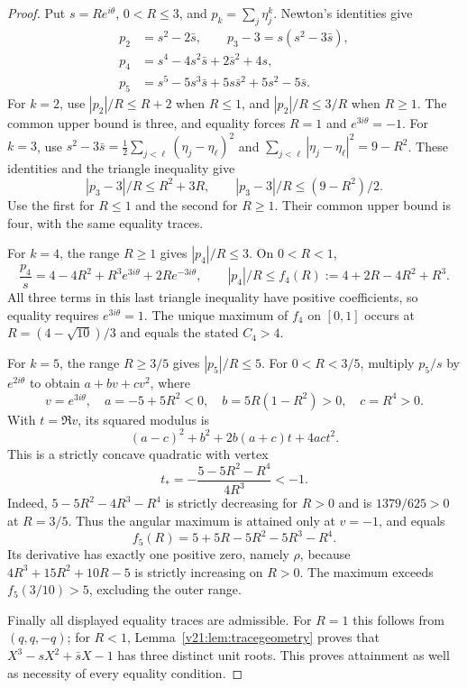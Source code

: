 \documentclass[UTF8,11pt]{ctexart}
\theoremstyle{definition}
\numberwithin{equation}{section}
\begin{document}
\begin{proof}
Put $s=R e^{i\theta}$, $0<R\le3$, and
$p_k=\sum_j\eta_j^k$. Newton's identities give
\[
 \begin{split}
 p_2&=s^2-2\bar s,\qquad p_3-3=s(s^2-3\bar s),\\
 p_4&=s^4-4s^2\bar s+2\bar s^2+4s,\\
 p_5&=s^5-5s^3\bar s+5s\bar s^2+5s^2-5\bar s.
 \end{split}
\]
For $k=2$, use $|p_2|/R\le R+2$ when $R\le1$, and
$|p_2|/R\le3/R$ when $R\ge1$. The common upper bound is three,
and equality forces $R=1$ and $e^{3i\theta}=-1$.
For $k=3$, use
$s^2-3\bar s=\tfrac12\sum_{j<\ell}(\eta_j-\eta_\ell)^2$
and $\sum_{j<\ell}|\eta_j-\eta_\ell|^2=9-R^2$.
These identities and the triangle inequality give
\[
 |p_3-3|/R\le R^2+3R,\qquad
 |p_3-3|/R\le(9-R^2)/2.
\]
Use the first for $R\le1$ and the second for $R\ge1$. Their
common upper bound is four, with the same equality traces.

For $k=4$, the range $R\ge1$ gives $|p_4|/R\le3$. On $0<R<1$,
\[
 \frac{p_4}{s}=4-4R^2+R^3e^{3i\theta}+2Re^{-3i\theta},
 \qquad |p_4|/R\le f_4(R):=4+2R-4R^2+R^3.
\]
All three terms in this last triangle inequality have positive
coefficients, so equality requires $e^{3i\theta}=1$.
The unique maximum of $f_4$ on $[0,1]$ occurs at
$R=(4-\sqrt{10})/3$ and equals the stated $C_4>4$.

For $k=5$, the range $R\ge3/5$ gives $|p_5|/R\le5$. For
$0<R<3/5$, multiply $p_5/s$ by $e^{2i\theta}$ to obtain
$a+bv+cv^2$, where
\[
 v=e^{3i\theta},\quad a=-5+5R^2<0,\quad
 b=5R(1-R^2)>0,\quad c=R^4>0.
\]
With $t=\Re v$, its squared modulus is
\[
 (a-c)^2+b^2+2b(a+c)t+4ac t^2.
\]
This is a strictly concave quadratic with vertex
\[
 t_*=-\frac{5-5R^2-R^4}{4R^3}<-1.
\]
Indeed, $5-5R^2-4R^3-R^4$ is strictly decreasing for $R>0$
and is $1379/625>0$ at $R=3/5$. Thus the angular maximum is
attained only at $v=-1$, and equals
\[
 f_5(R)=5+5R-5R^2-5R^3-R^4.
\]
Its derivative has exactly one positive zero, namely $\rho$,
because $4R^3+15R^2+10R-5$ is strictly increasing on $R>0$.
The maximum exceeds $f_5(3/10)>5$, excluding the outer range.

Finally all displayed equality traces are admissible. For $R=1$
this follows from $(q,q,-q)$; for $R<1$, Lemma~\ref{v21:lem:tracegeometry} proves that
$X^3-sX^2+\bar sX-1$ has three distinct unit roots. This proves
attainment as well as necessity of every equality condition.
\end{proof}
\end{document}
